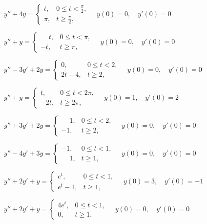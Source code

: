 \begin{exerciselist}
\item\label{exer:8.5.9}\CGex $y''+4y=\begin{cases}
t,&0\le t<\frac{\pi}{2},\\
\pi,&t\ge\frac{\pi}{2},
\end{cases}\quad y(0)=0,\quad y'(0)=0$

\item\label{exer:8.5.10}$y''+y=\begin{cases}
\phantom{-}t,&0\le t<\pi,\\
-t,&t\ge\pi,
\end{cases}\quad y(0)=0,\quad  y'(0)=0$

\item\label{exer:8.5.11}$y''-3y'+2y=\begin{cases}
0,&0\le t<2,\\
2t-4,&t\ge 2,
\end{cases}\quad y(0)=0,\quad y'(0)=0$

\item\label{exer:8.5.12}$y''+y=\begin{cases}
t,&0\le t<2\pi,\\
-2t,&t\ge 2\pi,
\end{cases}\quad y(0)=1,\quad y'(0)=2$

\item\label{exer:8.5.13}\CGex
$y''+3y'+2y=\begin{cases}
\phantom{-}1,&0\le t<2,\\
-1,&t\ge 2,
\end{cases}\quad y(0)=0,\quad y'(0)=0$

\item\label{exer:8.5.14}$y''-4y'+3y=\begin{cases}
-1,&0\le t<1,\\
\phantom{-}1,&t\ge 1,
\end{cases}\quad y(0)=0,\quad y'(0)=0$

\item\label{exer:8.5.15}$y''+2y'+y=\begin{cases}
e^t,&0\le t<1,\\
e^t-1,&t\ge 1,
\end{cases}\quad y(0)=3,\quad y'(0)=-1$

\item\label{exer:8.5.16}$y''+2y'+y=\begin{cases}
4e^t,&0\le t<1,\\
0,&t\ge 1,
\end{cases}\quad y(0)=0,\quad y'(0)=0$


\end{exerciselist}
